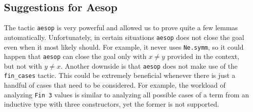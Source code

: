 \subsection{Suggestions for Aesop}

The tactic \texttt{aesop} is very powerful and allowed us to prove quite a few lemmas automatically. Unfortunately, in certain situations \texttt{aesop} does not close the goal even when it most likely should. For example, it never uses \texttt{Ne.symm}, so it could happen that \texttt{aesop} can close the goal only with $x \neq y$ provided in the context, but not with $y \neq x$. Another downside is that \texttt{aesop} does not make use of the \texttt{fin\_cases} tactic. This could be extremely beneficial whenever there is just a handful of cases that need to be considered. For example, the workload of analyzing \texttt{Fin 3} values is similar to analyzing all possible cases of a term from an inductive type with three constructors, yet the former is not supported.
